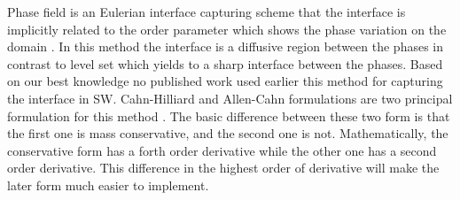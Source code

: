 \documentclass[letterpaper,10pt]{article}
\begin{document}

Phase field is an Eulerian interface capturing scheme that the interface is implicitly related to the order parameter which shows the phase variation on the domain \cite{Anderson1998}. 
In this method the interface is a diffusive region between the phases in contrast to level set which yields to a sharp interface between the phases. 
Based on our best knowledge no published work used earlier this method for capturing the interface in SW.
Cahn-Hilliard and Allen-Cahn formulations are two principal formulation for this method \cite{CahnHilliard1958i,CahnHilliard1958ii,Yang2006}. The basic difference between these two form is 
that the first one is mass conservative, and the second one is not. Mathematically, the conservative form has a forth order derivative while the other one has a second order derivative. 
This difference in the highest order of derivative will make the later form much easier to implement.\newline


\end{document}
